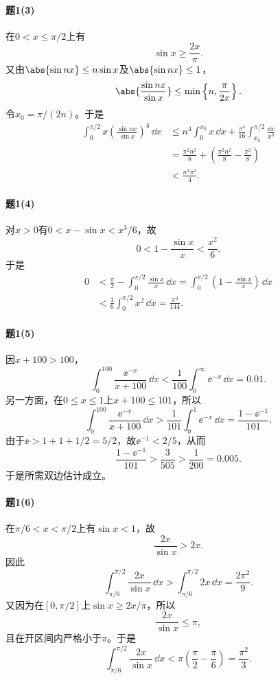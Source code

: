 \paragraph{题1(3)}
\begin{xsolution}
在$0<x\le\pi/2$上有
\[
 \sin x\ge\frac{2x}{\pi}.
\]
又由$\abs{\sin nx}\le n\sin x$及$\abs{\sin nx}\le1$，
\[
 \abs{\frac{\sin nx}{\sin x}}
 \le\min\left\{n,\frac\pi{2x}\right\}.
\]
令$x_0=\pi/(2n)$。于是
\begin{align*}
\int_0^{\pi/2}x\left(\frac{\sin nx}{\sin x}\right)^4\,\dd x
&\le n^4\int_0^{x_0}x\,\dd x
 +\frac{\pi^4}{16}\int_{x_0}^{\pi/2}\frac{\dd x}{x^3}\\
&=\frac{\pi^2n^2}{8}+\left(\frac{\pi^2n^2}{8}-\frac{\pi^2}{8}\right)\\
&<\frac{n^2\pi^2}{4}.
\end{align*}
\end{xsolution}

\paragraph{题1(4)}
\begin{xsolution}
对$x>0$有$0<x-\sin x<x^3/6$，故
\[
 0<1-\frac{\sin x}{x}<\frac{x^2}{6}.
\]
于是
\begin{align*}
0&<\frac\pi2-\int_0^{\pi/2}\frac{\sin x}{x}\,\dd x
 =\int_0^{\pi/2}\left(1-\frac{\sin x}{x}\right)\,\dd x\\
&<\frac16\int_0^{\pi/2}x^2\,\dd x
 =\frac{\pi^3}{144}.
\end{align*}
\end{xsolution}

\paragraph{题1(5)}
\begin{xsolution}
因$x+100>100$，
\[
 \int_0^{100}\frac{\ee^{-x}}{x+100}\,\dd x
 <\frac1{100}\int_0^{\infty}\ee^{-x}\,\dd x=0.01.
\]
另一方面，在$0\le x\le1$上$x+100\le101$，所以
\[
 \int_0^{100}\frac{\ee^{-x}}{x+100}\,\dd x
 >\frac1{101}\int_0^1\ee^{-x}\,\dd x
 =\frac{1-\ee^{-1}}{101}.
\]
由于$\ee>1+1+1/2=5/2$，故$\ee^{-1}<2/5$，从而
\[
 \frac{1-\ee^{-1}}{101}>\frac{3}{505}>\frac1{200}=0.005.
\]
于是所需双边估计成立。
\end{xsolution}

\paragraph{题1(6)}
\begin{xsolution}
在$\pi/6<x<\pi/2$上有$\sin x<1$，故
\[
 \frac{2x}{\sin x}>2x.
\]
因此
\[
 \int_{\pi/6}^{\pi/2}\frac{2x}{\sin x}\,\dd x
 >\int_{\pi/6}^{\pi/2}2x\,\dd x
 =\frac{2\pi^2}{9}.
\]
又因为在$[0,\pi/2]$上$\sin x\ge2x/\pi$，所以
\[
 \frac{2x}{\sin x}\le\pi,
\]
且在开区间内严格小于$\pi$。于是
\[
 \int_{\pi/6}^{\pi/2}\frac{2x}{\sin x}\,\dd x
 <\pi\left(\frac\pi2-\frac\pi6\right)
 =\frac{\pi^2}{3}.
\]
\end{xsolution}

